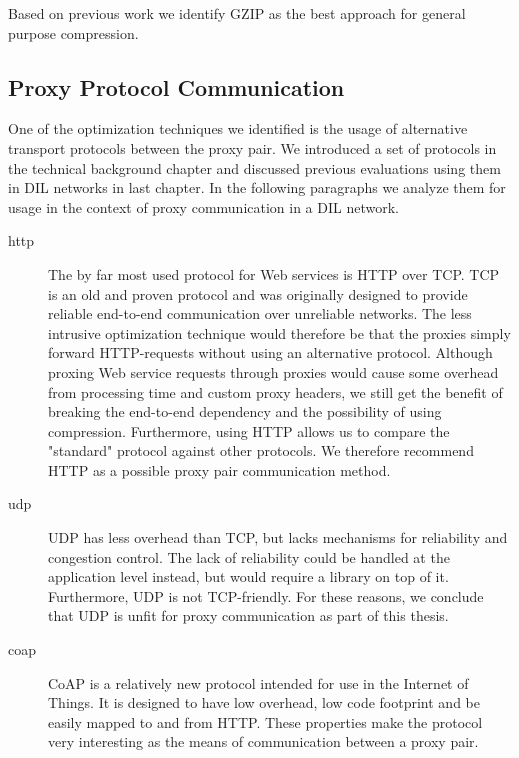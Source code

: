Based on previous work we identify GZIP as the best approach for general
purpose compression.

\subsection{Proxy Protocol Communication}

One of the optimization techniques we identified is the usage of alternative
transport protocols between the proxy pair. We introduced a set of protocols in
the technical background chapter and discussed previous evaluations using them
in DIL networks in last chapter. In the following paragraphs we analyze them for
usage in the context of proxy communication in a DIL network.

\begin{description}

    \item[\gls{http}] The by far most used protocol for Web services is HTTP
    over TCP. TCP is an old and proven protocol and was originally designed to
    provide reliable end-to-end communication over unreliable networks. The
    less intrusive optimization technique would therefore be that the proxies
    simply forward HTTP-requests without using an alternative protocol.
    Although proxing Web service requests through proxies would cause some overhead from
    processing time and custom proxy headers, we still get the benefit of
    breaking the end-to-end dependency and the possibility of using compression.
    Furthermore, using HTTP allows us to compare the "standard" protocol against
    other protocols. We therefore recommend HTTP as a possible proxy pair
    communication method.

    \item[\gls{udp}] UDP has less overhead than TCP, but lacks mechanisms for
    reliability and congestion control. The lack of reliability could be handled
    at the application level instead, but would require a library on top of it.
    Furthermore, UDP is not TCP-friendly. For these reasons, we conclude that UDP
    is unfit for proxy communication as part of this thesis.

	\item[\gls{coap}] CoAP is a relatively new protocol intended for use in the
	Internet of Things. It is designed to have low overhead, low code footprint
	and be easily mapped to and from HTTP. These properties make the protocol
	very interesting as the means of communication between a proxy pair.


\end{description}
